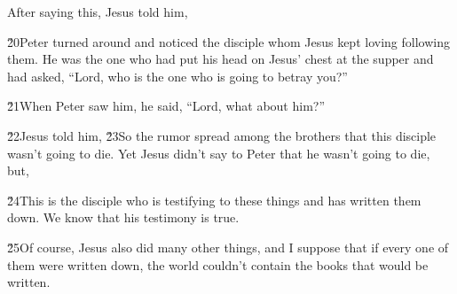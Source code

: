 After saying this, Jesus told him, 

\v{20}Peter turned around and noticed the disciple whom Jesus kept loving following them. He was the one who had put his head on Jesus' chest at the supper and had asked, ``Lord, who is the one who is going to betray you?''

\v{21}When Peter saw him, he said, ``Lord, what about him?''

\v{22}Jesus told him,  \v{23}So the rumor spread among the brothers that this disciple wasn't going to die. Yet Jesus didn't say to Peter that he wasn't going to die, but, 

\v{24}This is the disciple who is testifying to these things and has written them down. We know that his testimony is true.

\v{25}Of course, Jesus also did many other things, and I suppose that if every one of them were written down, the world couldn't contain the books that would be written.
